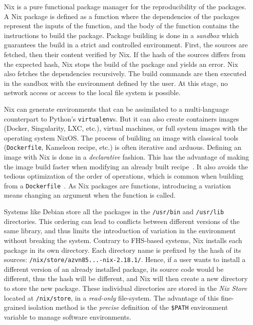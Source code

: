 \documentclass[sigconf,natbib=false]{acmart}
\begin{document}
Nix is a pure functional package manager for the reproducibility of the packages.
A Nix package is defined as a function where the dependencies of the packages represent the inputs of the function, and the body of the function contains the instructions to build the package.
Package building is done in a \emph{sandbox} which guarantees the build in a strict and controlled environment.
First, the sources are fetched, then their content verified by Nix.
If the hash of the sources differs from the expected hash, Nix stops the build of the package and yields an error.
Nix also fetches the dependencies recursively.
The build commands are then executed in the sandbox with the environment defined by the user.
At this stage, no network access or access to the local file system is possible.


Nix can generate environments that can be assimilated to a multi-language counterpart to Python's \texttt{virtualenv}s.
But it can also create containers images (Docker, Singularity, LXC, etc.), virtual machines, or full system images with the operating system NixOS.
The process of building an image with classical tools (\texttt{Dockerfile}, Kameleon recipe, etc.) is often iterative and arduous.
Defining an image with Nix is done in a \emph{declarative} fashion.
This has the advantage of making the image build faster when modifying an already built recipe\ \cite{nxc}.
It also avoids the tedious optimization of the order of operations, which is common when building from a \texttt{Dockerfile}\ \cite{docker_cache}. 
As Nix packages are functions, introducing a variation means changing an argument when the function is called.

Systems like Debian store all the packages in the \texttt{/usr/bin} and \texttt{/usr/lib} directories.
This ordering can lead to conflicts between different versions of the same library, and thus limits the introduction of variation in the environment without breaking the system.
Contrary to FHS-based systems, Nix installs each package in its own directory.
Each directory name is prefixed by the hash of its sources: \texttt{/nix/store/azvn85...-nix-2.18.1/}.
Hence, if a user wants to install a different version of an already installed package, its source code would be different, thus the hash will be different, and Nix will then create a new directory to store the new package.
These individual directories are stored in the \emph{Nix Store} located at \texttt{/nix/store}, in a \emph{read-only} file-system.
The advantage of this fine-grained isolation method is the \emph{precise} definition of the \texttt{\$PATH} environment variable to manage software environments.
\end{document}
